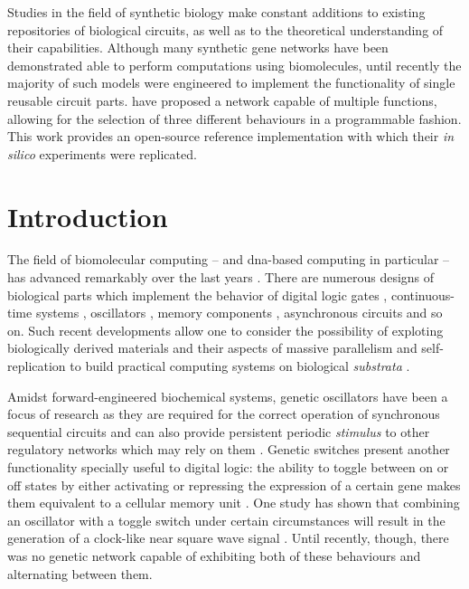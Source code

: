 
  \noindent Studies in the field of synthetic biology make constant additions to existing repositories of biological circuits, as well as to the theoretical understanding of their capabilities.
  Although many synthetic gene networks have been demonstrated able to perform computations using biomolecules, until recently the majority of such models were engineered to implement the functionality of single reusable circuit parts.
  \citet{multif} have proposed a network capable of multiple functions, allowing for the selection of three different behaviours in a programmable fashion.
  This work provides an open-source reference implementation with which their \textit{in silico} experiments were replicated.


\section{Introduction}

  The field of biomolecular computing -- and \acs{dna}-based computing in particular -- has advanced remarkably over the last years \cite{history}.
  There are numerous designs of biological parts which implement the behavior of digital logic gates \cite{reconfgate}, continuous-time systems \cite{analog}, oscillators \cite{repressilator}, memory components \cite{register}, asynchronous circuits \cite{async} and so on.
  Such recent developments allow one to consider the possibility of exploting biologically derived materials and their aspects of massive parallelism and self-replication to build practical computing systems on biological \textit{substrata} \cite{youtuber}.

  Amidst forward-engineered biochemical systems, genetic oscillators have been a focus of research \cite{optoscillator} as they are required for the correct operation of synchronous sequential circuits and can also provide persistent periodic \textit{stimulus} to other regulatory networks which may rely on them \cite{bioapps}.
  Genetic switches present another functionality specially useful \cite{bioapps} to digital logic: the ability to toggle between on or off states by either activating or repressing the expression of a certain gene makes them equivalent to a cellular memory unit \cite{youtuber}.
  One study has shown that combining an oscillator with a toggle switch under certain circumstances will result in the generation of a clock-like near square wave signal \cite{clock}.
  Until recently, though, there was no genetic network capable of exhibiting both of these behaviours and alternating between them.

